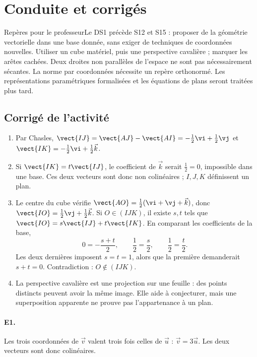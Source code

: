 \ifprof\clearpage\section{Conduite et corrigés}\begin{profbox}{Repères pour le professeur}Le DS1 précède S12 et S15 : proposer de la géométrie vectorielle dans une base donnée, sans exiger de techniques de coordonnées nouvelles. Utiliser un cube matériel, puis une perspective cavalière ; marquer les arêtes cachées. Deux droites non parallèles de l'espace ne sont pas nécessairement sécantes. La norme par coordonnées nécessite un repère orthonormé. Les représentations paramétriques formalisées et les équations de plans seront traitées plus tard.\end{profbox}

\subsection{Corrigé de l'activité}\begin{enumerate}
\item Par Chasles, $\vect{IJ}=\vect{AJ}-\vect{AI}=-\frac12\vi +\frac12\vj $ et $\vect{IK}=-\frac12\vi +\frac12\vec k$.
\item Si $\vect{IK}=t\vect{IJ}$, le coefficient de $\vec k$ serait $\frac{1}{2}=0$, impossible dans une base. Ces deux vecteurs sont donc non colinéaires ; $I,J,K$ définissent un plan.
\item Le centre du cube vérifie $\vect{AO}=\frac12(\vi +\vj +\vec k)$, donc $\vect{IO}=\frac12\vj +\frac12\vec k$. Si $O\in(IJK)$, il existe $s,t$ tels que $\vect{IO}=s\vect{IJ}+t\vect{IK}$. En comparant les coefficients de la base,
\[0=-\frac{s+t}2,\qquad \frac12=\frac s2,\qquad \frac12=\frac t2.\]
Les deux dernières imposent $s=t=1$, alors que la première demanderait $s+t=0$. Contradiction : $O\notin(IJK)$.
\item La perspective cavalière est une projection sur une feuille : des points distincts peuvent avoir la même image. Elle aide à conjecturer, mais une superposition apparente ne prouve pas l'appartenance à un plan.
\end{enumerate}

\paragraph{E1.}Les trois coordonnées de $\vec v$ valent trois fois celles de $\vec u$ : $\vec v=3\vec u$. Les deux vecteurs sont donc colinéaires.

